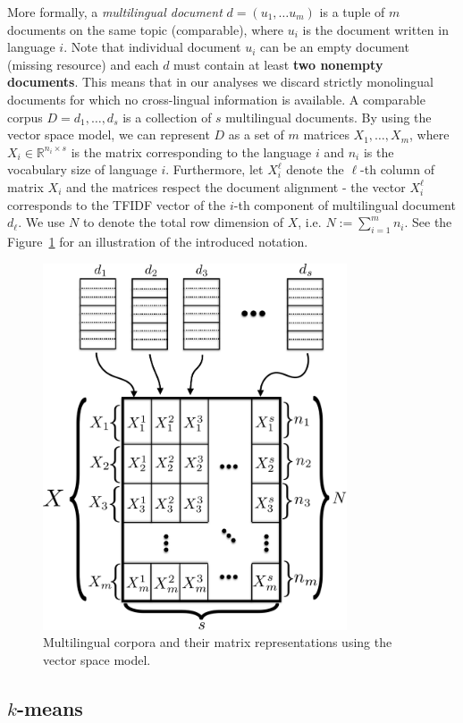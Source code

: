 \documentclass[twoside,11pt]{article}
\newcommand{\RR}{\mathbb{R}}
\begin{document}
More formally, a \emph{multilingual document} $d = (u_1,\ldots u_m)$ is a tuple of $m$ documents on the same topic (comparable), where $u_i$ is the document written in language $i$. Note that individual document $u_i$ can be an empty document (missing resource) and each $d$ must contain at least \textbf{two nonempty documents}. This means that in our analyses we discard strictly monolingual documents for which no cross-lingual information is available. A comparable corpus $D = {d_1, \ldots, d_s}$ is a collection of $s$ multilingual documents. By using the vector space model, we can represent $D$ as a set of $m$ matrices $X_1,\ldots,X_m$, where $X_i \in \RR^{n_i \times s}$ is the matrix corresponding to the language $i$ and $n_i$ is the vocabulary size of language $i$. Furthermore, let $X_i^{\ell}$ denote the $\ell$-th column of matrix $X_i$ and the matrices respect the document alignment - the vector $X_i^\ell$ corresponds to the TFIDF vector of the $i$-th component of multilingual document $d_\ell$. We use $N$ to denote the total row dimension of $X$, i.e. $N:= \sum_{i=1}^m n_i$. See the Figure~\ref{fig:stacked_matrices} for an illustration of the introduced notation.

\begin{figure}[tbp]
\centering
\includegraphics[width=9cm]{stacked_matrices.pdf}
\caption{\label{fig:stacked_matrices} Multilingual corpora and their matrix representations using the vector space model.}
\end{figure}


\subsection{$k$-means}\label{sec:kmeans}
\end{document}
